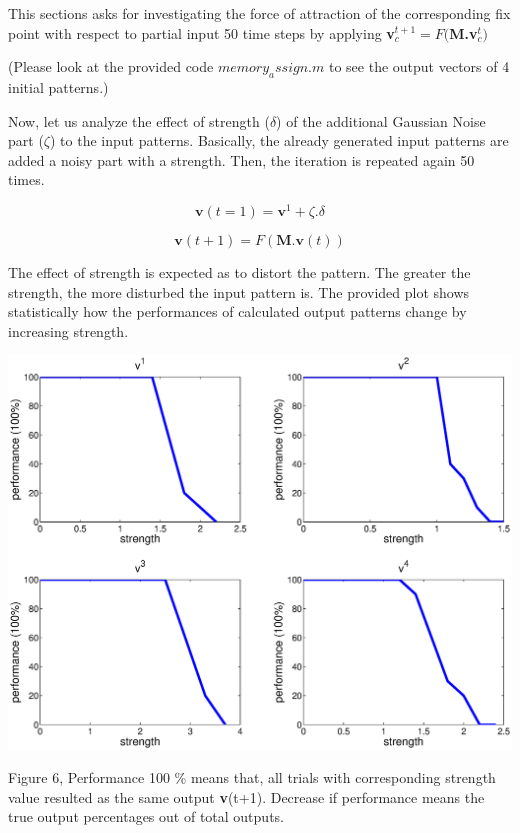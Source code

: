 \documentclass{article}
\begin{document}
This sections asks for investigating the force of attraction of the corresponding fix point with respect to partial input 50 time steps by applying \textbf{v}$_c ^{t+1}=F($\textbf{M.v}$_c ^t ) $

(Please look at the provided code $memory_assign.m$ to see the output vectors of 4 initial patterns.)

Now, let us analyze the effect of strength ($\delta$) of the additional Gaussian Noise part ($\zeta$) to the input patterns. Basically, the already generated input patterns are added a noisy part with a strength. Then, the iteration is repeated again 50 times.

\begin{equation}
 \textbf{v}(t=1)=\textbf{v}^1+\zeta.\delta
\end{equation}

\begin{equation*}
 \textbf{v}(t+1)=F(\textbf{M.v}(t)) 
\end{equation*}

The effect of strength is expected as to distort the pattern. The greater the strength, the more disturbed the input pattern is. The provided plot shows statistically how the performances of calculated output patterns change by increasing strength. 

 \begin{center}
	\includegraphics[width=\textwidth]{strenghts.eps}
\begin{footnotesize}
 Figure 6, Performance 100 \% means that, all trials with corresponding strength value resulted as the same output \textbf{v}(t+1). Decrease if performance means the true output percentages out of total outputs.  
\end{footnotesize}
\end{center}
\end{document}
